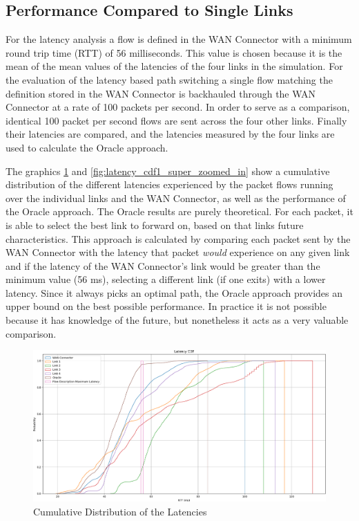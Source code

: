 \subsection{Performance Compared to Single Links}

For the latency analysis a flow is defined in the WAN Connector with a minimum round trip time (RTT) of 56 milliseconds. This value is chosen because it is the mean of the mean values of the latencies of the four links in the simulation. For the evaluation of the latency based path switching a single flow matching the definition stored in the WAN Connector is backhauled through the WAN Connector at a rate of 100 packets per second. In order to serve as a comparison, identical 100 packet per second flows are sent across the four other links. Finally their latencies are compared, and the latencies measured by the four links are used to calculate the Oracle approach.

The graphics \ref{fig:latency_cdf1} and \ref{fig:latency_cdf1_super_zoomed_in} show a cumulative distribution of the different latencies experienced by the packet flows running over the individual links and the WAN Connector, as well as the performance of the Oracle approach. The Oracle results are purely theoretical. For each packet, it is able to select the best link to forward on, based on that links future characteristics. This approach is calculated by comparing each packet sent by the WAN Connector with the latency that packet \textit{would} experience on any given link and if the latency of the WAN Connector's link would be greater than the minimum value (56 ms), selecting a different link (if one exits) with a lower latency. Since it always picks an optimal path, the Oracle approach provides an upper bound on the best possible performance. In practice it is not possible because it has knowledge of the future, but nonetheless it acts as a very valuable comparison.

\begin{figure}[h]
    \centering
        \includegraphics[height=0.8\textwidth,width=\textwidth]{fig/latency_cdf1.png}
        \caption{Cumulative Distribution of the Latencies}
        \label{fig:latency_cdf1}
\end{figure}

